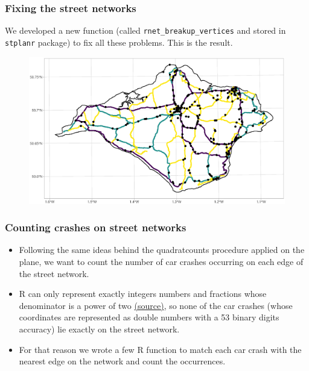 \documentclass[c,10pt,pdftex]{beamer}
\begin{document}
\begin{frame}
\begin{columns}
\begin{column}{0.5\linewidth}
\begin{figure}
	\end{figure}
\end{column}
\end{columns}
\end{frame}

\begin{frame}
\frametitle{Fixing the street networks}
\vspace{-0.25cm}
We developed a new function (called \texttt{rnet\_breakup\_vertices} and stored in \texttt{stplanr} package) to fix all these problems. This is the result. 
\begin{figure}
	\centering
	\includegraphics[width=\linewidth]{images/breaking_network}
\end{figure}
\end{frame}

\begin{frame}
\frametitle{Counting crashes on street networks}
\vspace{-0.75cm}
\begin{itemize}
	\setlength\itemsep{1em}
	\item Following the same ideas behind the quadratcounts procedure applied on the plane, we want to \alert{count the number of car crashes occurring on each edge of the street network}. 
	\item R can only represent exactly integers numbers and fractions whose denominator is a power of two \href{https://cran.r-project.org/doc/FAQ/R-FAQ.html\#Why-doesn_0027t-R-think-these-numbers-are-equal_003f}{(source)}, so none of the car crashes (whose coordinates are represented as double numbers with a 53 binary digits accuracy) lie exactly on the street network.
	\item For that reason we wrote a few R function to match each car crash with the nearest edge on the network and count the occurrences.
\end{itemize}
\end{frame}
\end{document}
